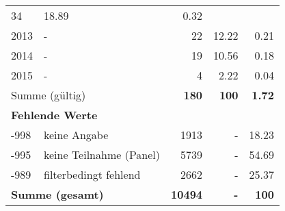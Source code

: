 \begin{longtable}{lXrrr}
       \num{34} &
       \num[round-mode=places,round-precision=2]{18,89} &
         \num[round-mode=places,round-precision=2]{0,32} \\

     2013 &
     \multicolumn{1}{X}{ -  } &


       \num{22} &
       \num[round-mode=places,round-precision=2]{12,22} &
         \num[round-mode=places,round-precision=2]{0,21} \\

     2014 &
     \multicolumn{1}{X}{ -  } &


       \num{19} &
       \num[round-mode=places,round-precision=2]{10,56} &
         \num[round-mode=places,round-precision=2]{0,18} \\

     2015 &
     \multicolumn{1}{X}{ -  } &


       \num{4} &
       \num[round-mode=places,round-precision=2]{2,22} &
         \num[round-mode=places,round-precision=2]{0,04} \\
     \midrule
     \multicolumn{2}{l}{Summe (gültig)} &
       \textbf{\num{180}} &
     \textbf{100} &
       \textbf{\num[round-mode=places,round-precision=2]{1,72}} \\
     \multicolumn{5}{l}{\textbf{Fehlende Werte}}\\
       -998 &
       keine Angabe &
         \num{1913} &
        - &
         \num[round-mode=places,round-precision=2]{18,23} \\
       -995 &
       keine Teilnahme (Panel) &
         \num{5739} &
        - &
         \num[round-mode=places,round-precision=2]{54,69} \\
       -989 &
       filterbedingt fehlend &
         \num{2662} &
        - &
         \num[round-mode=places,round-precision=2]{25,37} \\
     \midrule
     \multicolumn{2}{l}{\textbf{Summe (gesamt)}} &
          \textbf{\num{10494}} &
        \textbf{-} &
        \textbf{100} \\
     \bottomrule
     \end{longtable}
     
